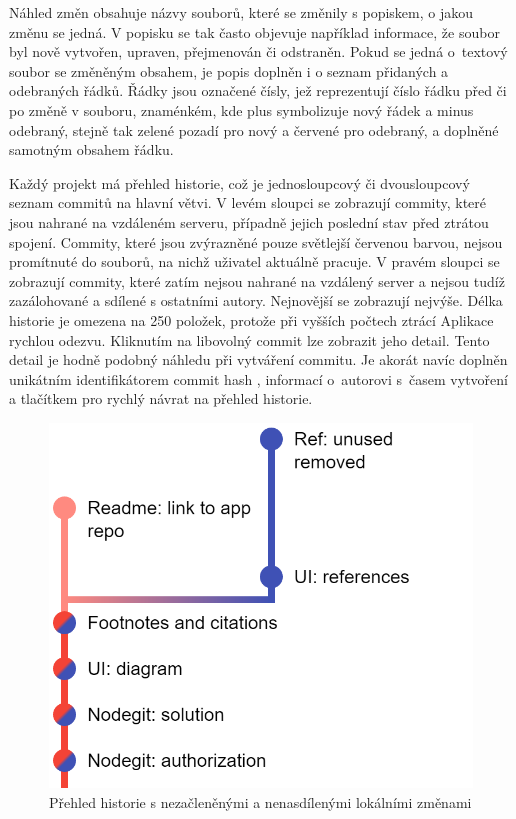 Náhled změn obsahuje názvy souborů, které se změnily s popiskem, o jakou změnu se jedná. V popisku se tak často objevuje například informace, že soubor byl nově vytvořen, upraven, přejmenován či odstraněn. Pokud se jedná o~textový soubor se změněným obsahem, je popis doplněn i o seznam přidaných a odebraných řádků. Řádky jsou označené čísly, jež reprezentují číslo řádku před či po změně v souboru, znaménkém, kde plus symbolizuje nový řádek a minus odebraný, stejně tak zelené pozadí pro nový a červené pro odebraný, a doplněné samotným obsahem řádku.

Každý projekt má přehled historie, což je jednosloupcový či dvousloupcový seznam commitů na hlavní větvi. V levém sloupci se zobrazují commity, které jsou nahrané na vzdáleném serveru, případně jejich poslední stav před ztrátou spojení. Commity, které jsou zvýrazněné pouze světlejší červenou barvou, nejsou promítnuté do souborů, na nichž uživatel aktuálně pracuje. V pravém sloupci se zobrazují commity, které zatím nejsou nahrané na vzdálený server a nejsou tudíž zazálohované a sdílené s ostatními autory. Nejnovější se zobrazují nejvýše. Délka historie je omezena na 250 položek, protože při vyšších počtech ztrácí Aplikace rychlou odezvu. Kliknutím na libovolný commit lze zobrazit jeho detail. Tento detail je hodně podobný náhledu při vytváření commitu. Je akorát navíc doplněn unikátním identifikátorem commit hash \cite{commit-hash}, informací o~autorovi s~časem vytvoření a tlačítkem pro rychlý návrat na přehled historie.

\FloatBarrier
\begin{figure}[ht]
	\centering
	\includegraphics[scale=0.5]{sections/ui/images/history.png}
	\caption[Historie]{Přehled historie s nezačleněnými a nenasdílenými lokálními změnami}
	\label{fig:history}
\end{figure}
\FloatBarrier

